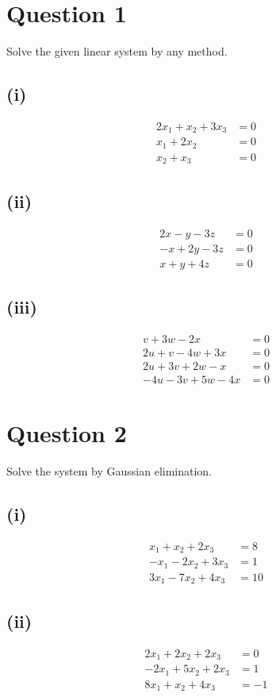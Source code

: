 \documentclass[12pt]{article}
\begin{document}
\section*{Question 1}
Solve the given linear system by any method.

\subsection*{(i)}
\begin{align*}
2x_1 + x_2 + 3x_3 &= 0\\
x_1 + 2x_2 &= 0\\
x_2 + x_3 &= 0
\end{align*}

\subsection*{(ii)}
\begin{align*}
2x - y - 3z &= 0\\
-x + 2y - 3z &= 0\\
x + y + 4z &= 0
\end{align*}

\subsection*{(iii)}
\begin{align*}
v + 3w - 2x &= 0\\
2u + v - 4w + 3x &= 0\\
2u + 3v + 2w - x &= 0\\
-4u - 3v + 5w - 4x &= 0
\end{align*}

\section*{Question 2}
Solve the system by Gaussian elimination.

\subsection*{(i)}
\begin{align*}
x_1 + x_2 + 2x_3 &= 8\\
-x_1 - 2x_2 + 3x_3 &= 1\\
3x_1 - 7x_2 + 4x_3 &= 10
\end{align*}

\subsection*{(ii)}
\begin{align*}
2x_1 + 2x_2 + 2x_3 &= 0\\
-2x_1 + 5x_2 + 2x_3 &= 1\\
8x_1 + x_2 + 4x_3 &= -1
\end{align*}
\end{document}
